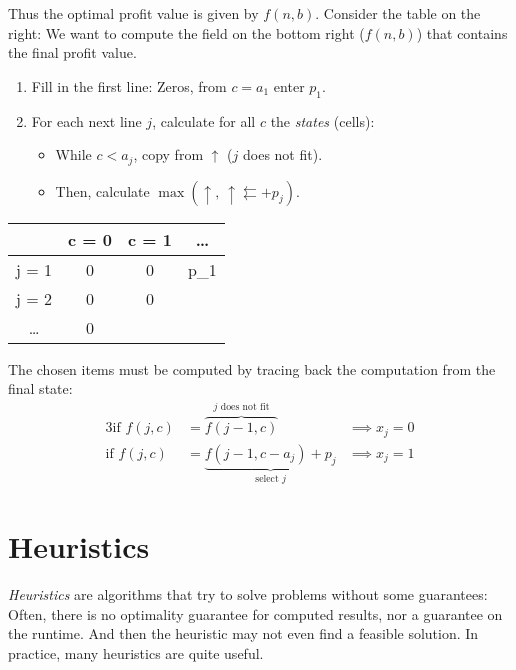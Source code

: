 \documentclass[english]{panikzettel}
\begin{document}
\begin{minipage}[t]{0.6\textwidth}
  Thus the optimal profit value is given by $f(n,b)$.
  Consider the table on the right: We want to compute the field on the bottom right ($f(n,b)$) that contains the final profit value.
  \begin{enumerate}
    \item Fill in the first line: Zeros, from $c = a_1$ enter $p_1$.
    \item For each next line $j$, calculate for all $c$ the \emph{states} (cells):
      \begin{itemize}
        \item While $c < a_j$, copy from $\uparrow$ ($j$ does not fit).
        \item Then, calculate $\max(\uparrow,~ \uparrow \leftleftarrows + p_j)$.
      \end{itemize}
  \end{enumerate}
\end{minipage}\hfil%
\begin{minipage}[t]{0.35\textwidth}
  \centering
  \vspace{0\baselineskip}
  \begin{tabular}{C|C|C|C}
          & c = 0 & c = 1 & \ldots \\ \hline
    j = 1 & 0     & 0     & p_1    \\ \hline
    j = 2 & 0     & 0     &        \\ \hline
    \ldots & 0      &      &
  \end{tabular}
\end{minipage}
\medskip

The chosen items must be computed by tracing back the computation from the final state:
\begin{alignat*}{3}
  \text{if } f(j,c) &= \overbrace{f(j-1,c)}^\text{$j$ does not fit} &\implies x_j = 0 \\
  \text{if } f(j,c) &= \underbrace{f(j-1,c-a_j)+p_j}_\text{select $j$} &\implies x_j = 1
\end{alignat*}

\section{Heuristics}

\emph{Heuristics} are algorithms that try to solve problems without some guarantees:
Often, there is no optimality guarantee for computed results, nor a guarantee on the runtime.
And then the heuristic may not even find a feasible solution.
In practice, many heuristics are quite useful.
\end{document}
